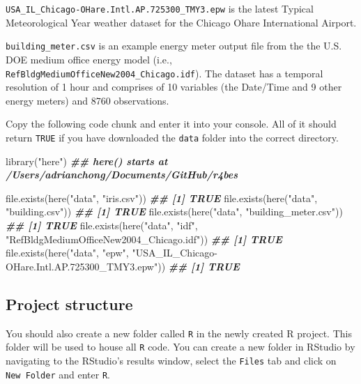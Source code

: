 \documentclass[
]{book}
\newenvironment{Shaded}{\begin{snugshade}}{\end{snugshade}}
\newcommand{\DocumentationTok}[1]{\textcolor[rgb]{0.56,0.35,0.01}{\textbf{\textit{#1}}}}
\newcommand{\FunctionTok}[1]{\textcolor[rgb]{0.00,0.00,0.00}{#1}}
\newcommand{\NormalTok}[1]{#1}
\newcommand{\StringTok}[1]{\textcolor[rgb]{0.31,0.60,0.02}{#1}}
\begin{document}
\texttt{USA\_IL\_Chicago-OHare.Intl.AP.725300\_TMY3.epw} is the latest Typical Meteorological Year weather dataset for the Chicago Ohare International Airport.

\texttt{building\_meter.csv} is an example energy meter output file from the the U.S. DOE medium office energy model (i.e., \texttt{RefBldgMediumOfficeNew2004\_Chicago.idf}). The dataset has a temporal resolution of 1 hour and comprises of 10 variables (the Date/Time and 9 other energy meters) and 8760 observations.

Copy the following code chunk and enter it into your console. All of it should return \texttt{TRUE} if you have downloaded the \texttt{data} folder into the correct directory.

\begin{Shaded}
\begin{Highlighting}[]
\FunctionTok{library}\NormalTok{(}\StringTok{"here"}\NormalTok{)}
\DocumentationTok{\#\# here() starts at /Users/adrianchong/Documents/GitHub/r4bes}

\FunctionTok{file.exists}\NormalTok{(}\FunctionTok{here}\NormalTok{(}\StringTok{"data"}\NormalTok{, }\StringTok{"iris.csv"}\NormalTok{))}
\DocumentationTok{\#\# [1] TRUE}
\FunctionTok{file.exists}\NormalTok{(}\FunctionTok{here}\NormalTok{(}\StringTok{"data"}\NormalTok{, }\StringTok{"building.csv"}\NormalTok{))}
\DocumentationTok{\#\# [1] TRUE}
\FunctionTok{file.exists}\NormalTok{(}\FunctionTok{here}\NormalTok{(}\StringTok{"data"}\NormalTok{, }\StringTok{"building\_meter.csv"}\NormalTok{))}
\DocumentationTok{\#\# [1] TRUE}
\FunctionTok{file.exists}\NormalTok{(}\FunctionTok{here}\NormalTok{(}\StringTok{"data"}\NormalTok{, }\StringTok{"idf"}\NormalTok{, }\StringTok{"RefBldgMediumOfficeNew2004\_Chicago.idf"}\NormalTok{))}
\DocumentationTok{\#\# [1] TRUE}
\FunctionTok{file.exists}\NormalTok{(}\FunctionTok{here}\NormalTok{(}\StringTok{"data"}\NormalTok{, }\StringTok{"epw"}\NormalTok{, }\StringTok{"USA\_IL\_Chicago{-}OHare.Intl.AP.725300\_TMY3.epw"}\NormalTok{))}
\DocumentationTok{\#\# [1] TRUE}
\end{Highlighting}
\end{Shaded}

\hypertarget{project-structure}{%
\subsection{Project structure}\label{project-structure}}

You should also create a new folder called \texttt{R} in the newly created R project. This folder will be used to house all \texttt{R} code. You can create a new folder in RStudio by navigating to the RStudio's results window, select the \texttt{Files} tab and click on \texttt{New\ Folder} and enter \texttt{R}.
\end{document}
